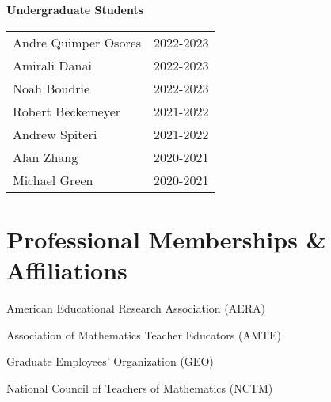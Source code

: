 \documentclass[margin,line]{res}
\newenvironment{list3}{
        \begin{list}{\ding{113}}{%
            \setlength{\itemsep}{0in}
            \setlength{\parsep}{0in} \setlength{\parskip}{0in}
            \setlength{\topsep}{0in} \setlength{\partopsep}{0in}
            \setlength{\leftmargin}{0in}
            \setlength{\rightmargin}{1.25in}}}{\end{list}}
\begin{document}
\begin{resume}
{\bf Undergraduate Students}

\begin{tabular}{@{}p{4.0in}p{1.0in}}
  Andre Quimper Osores & \multirow{1}{1in}{2022-2023}\\
  Amirali Danai & \multirow{1}{1in}{2022-2023}\\
  Noah Boudrie & \multirow{1}{1in}{2022-2023}\\
  Robert Beckemeyer & \multirow{1}{1in}{2021-2022}\\
  Andrew Spiteri & \multirow{1}{1in}{2021-2022}\\
  Alan Zhang & \multirow{1}{1in}{2020-2021}\\
  Michael Green & \multirow{1}{1in}{2020-2021}\\
\end{tabular}
\newpage
\section{\sc Professional Memberships \& Affiliations}
\begin{list3}
  \item American Educational Research Association (AERA)
  \item Association of Mathematics Teacher Educators (AMTE)
  \item Graduate Employees' Organization (GEO)
  \item National Council of Teachers of Mathematics (NCTM)
  
\end{list3}

\end{resume}
\end{document}

